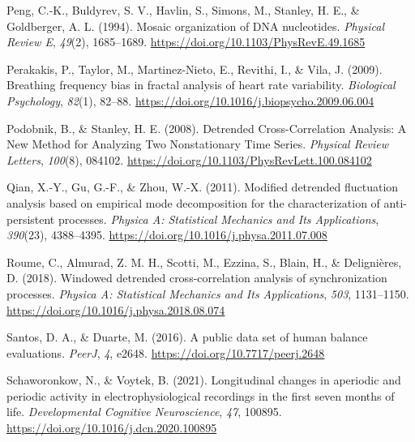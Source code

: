 \documentclass[
  man]{apa6}
\newlength{\cslhangindent}
\newlength{\cslentryspacingunit} %
\newenvironment{CSLReferences}[2] %
 {%
  \setlength{\parindent}{0pt}
  \ifodd #1
  \let\oldpar\par
  \def\par{\hangindent=\cslhangindent\oldpar}
  \fi
  \setlength{\parskip}{#2\cslentryspacingunit}
 }%
 {}
\begin{document}
\begin{CSLReferences}{1}{0}
\leavevmode{}%
Peng, C.-K., Buldyrev, S. V., Havlin, S., Simons, M., Stanley, H. E., \& Goldberger, A. L. (1994). Mosaic organization of {DNA} nucleotides. \emph{Physical Review E}, \emph{49}(2), 1685--1689. \url{https://doi.org/10.1103/PhysRevE.49.1685}

\leavevmode{}%
Perakakis, P., Taylor, M., Martinez-Nieto, E., Revithi, I., \& Vila, J. (2009). Breathing frequency bias in fractal analysis of heart rate variability. \emph{Biological Psychology}, \emph{82}(1), 82--88. \url{https://doi.org/10.1016/j.biopsycho.2009.06.004}

\leavevmode{}%
Podobnik, B., \& Stanley, H. E. (2008). Detrended {Cross}-{Correlation} {Analysis}: {A} {New} {Method} for {Analyzing} {Two} {Nonstationary} {Time} {Series}. \emph{Physical Review Letters}, \emph{100}(8), 084102. \url{https://doi.org/10.1103/PhysRevLett.100.084102}

\leavevmode{}%
Qian, X.-Y., Gu, G.-F., \& Zhou, W.-X. (2011). Modified detrended fluctuation analysis based on empirical mode decomposition for the characterization of anti-persistent processes. \emph{Physica A: Statistical Mechanics and Its Applications}, \emph{390}(23), 4388--4395. \url{https://doi.org/10.1016/j.physa.2011.07.008}

\leavevmode{}%
Roume, C., Almurad, Z. M. H., Scotti, M., Ezzina, S., Blain, H., \& Delignières, D. (2018). Windowed detrended cross-correlation analysis of synchronization processes. \emph{Physica A: Statistical Mechanics and Its Applications}, \emph{503}, 1131--1150. \url{https://doi.org/10.1016/j.physa.2018.08.074}

\leavevmode{}%
Santos, D. A., \& Duarte, M. (2016). A public data set of human balance evaluations. \emph{PeerJ}, \emph{4}, e2648. \url{https://doi.org/10.7717/peerj.2648}

\leavevmode{}%
Schaworonkow, N., \& Voytek, B. (2021). Longitudinal changes in aperiodic and periodic activity in electrophysiological recordings in the first seven months of life. \emph{Developmental Cognitive Neuroscience}, \emph{47}, 100895. \url{https://doi.org/10.1016/j.dcn.2020.100895}


\end{CSLReferences}
\end{document}
